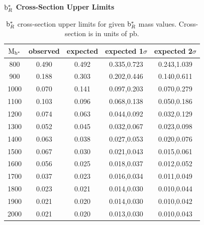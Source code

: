 \clearpage

\begin{table}[htcb]
\begin{center}
\bf{$\mathrm{b}^{*}_{R}$ Cross-Section Upper Limits}\\
\begin{tabular}{|c||c|c|c|c|}
\hline
\bf{$\mathrm{M_{\mathrm{b}^{*}}}$} & \bf{observed}  & \bf{expected} & \bf{expected 1$\sigma$}  & \bf{expected 2$\sigma$} \\
\hline
\hline
800 & 0.490 & 0.492 & 0.335,0.723 & 0.243,1.039\\ 
\hline
900 & 0.188 & 0.303 & 0.202,0.446 & 0.140,0.611\\ 
\hline
1000 & 0.070 & 0.141 & 0.097,0.203 & 0.070,0.279\\ 
\hline
1100 & 0.103 & 0.096 & 0.068,0.138 & 0.050,0.186\\ 
\hline
1200 & 0.074 & 0.063 & 0.044,0.092 & 0.032,0.129\\ 
\hline
1300 & 0.052 & 0.045 & 0.032,0.067 & 0.023,0.098\\ 
\hline
1400 & 0.063 & 0.038 & 0.027,0.053 & 0.020,0.076\\ 
\hline
1500 & 0.067 & 0.030 & 0.021,0.043 & 0.015,0.061\\
\hline
1600 & 0.056 & 0.025 & 0.018,0.037 & 0.012,0.052\\ 
\hline
1700 & 0.037 & 0.023 & 0.016,0.034 & 0.011,0.049\\ 
\hline
1800 & 0.023 & 0.021 & 0.014,0.030 & 0.010,0.044\\ 
\hline
1900 & 0.021 & 0.020 & 0.014,0.030 & 0.010,0.042\\ 
\hline
2000 & 0.021 & 0.020 & 0.013,0.030 & 0.010,0.043\\ 
\hline
\end{tabular}
\end{center}
\caption{$\mathrm{b}^{*}_R$ cross-section upper limits for given $\mathrm{b}^{*}_R$ mass values.  Cross-section is in units of pb.}
\label{table:bsupperxsecR}
\end{table}



